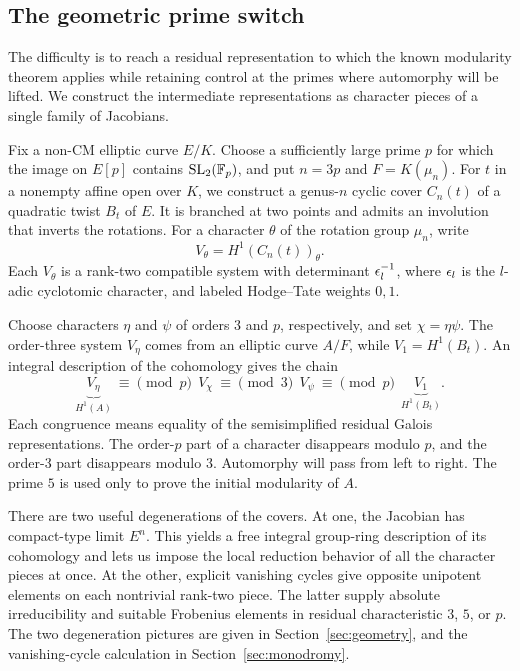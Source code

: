 \subsection{The geometric prime switch}

The difficulty is to reach a residual representation to which the known
modularity theorem applies while retaining control at the primes where
automorphy will be lifted. We construct the intermediate representations
as character pieces of a single family of Jacobians.

Fix a non-CM elliptic curve $E/K$. Choose a sufficiently large prime $p$
for which the image on $E[p]$ contains $\operatorname{SL}_2(\mathbb F_p)$, and put
$n=3p$ and $F=K(\mu_n)$. For $t$ in a nonempty affine open over $K$, we
construct a genus-$n$ cyclic cover $C_n(t)$ of a quadratic twist $B_t$ of
$E$. It is branched at two points and admits an involution that inverts
the rotations. For a character $\theta$ of the rotation group $\mu_n$,
write
\[
 V_\theta=H^1(C_n(t))_\theta.
\]
Each $V_\theta$ is a rank-two compatible system with determinant
$\epsilon_l^{-1}$, where $\epsilon_l$ is the $l$-adic cyclotomic character, and
labeled Hodge--Tate weights $0,1$.

Choose characters $\eta$ and $\psi$ of orders $3$ and $p$, respectively,
and set $\chi=\eta\psi$. The order-three system $V_\eta$ comes from an
elliptic curve $A/F$, while $V_1=H^1(B_t)$. An integral description of the
cohomology gives the chain
\begin{equation}\label{intro:chain}
 \underbrace{V_\eta}_{H^1(A)}
 \ \equiv\!\!\pmod p\ \ V_\chi
 \ \equiv\!\!\pmod 3\ \ V_\psi
 \ \equiv\!\!\pmod p\ \ \underbrace{V_1}_{H^1(B_t)}.
\end{equation}
Each congruence means equality of the semisimplified residual Galois
representations. The order-$p$ part of a character disappears modulo
$p$, and the order-$3$ part disappears modulo $3$. Automorphy will pass
from left to right. The prime $5$ is used only to prove the initial
modularity of $A$.

There are two useful degenerations of the covers. At one, the Jacobian
has compact-type limit $E^n$. This yields a free integral group-ring
description of its cohomology and lets us impose the local reduction
behavior of all the character pieces at once. At the other, explicit
vanishing cycles give opposite unipotent elements on each nontrivial
rank-two piece. The latter supply absolute irreducibility and suitable
Frobenius elements in residual characteristic $3$, $5$, or $p$.
The two degeneration pictures are given in
Section~\ref{sec:geometry}, and the vanishing-cycle calculation in
Section~\ref{sec:monodromy}.

